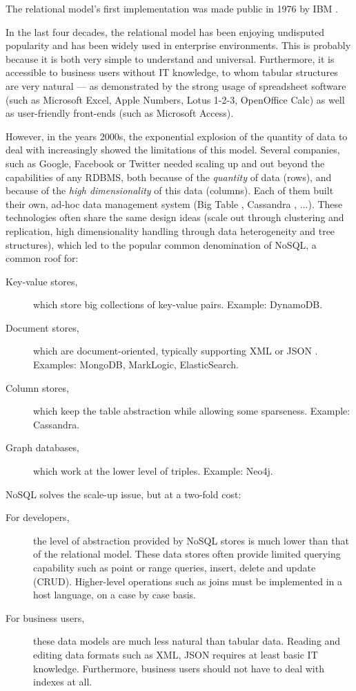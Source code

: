 \documentclass{acm_proc_article-sp}
\begin{document}
The relational model's first implementation was made public in 1976 by IBM \cite{Astrahan1976}.

In the last four decades, the relational model has been enjoying undisputed popularity and has been widely used in enterprise environments. This is probably because it is both very simple to understand and universal. Furthermore, it is accessible to business users without IT knowledge, to whom tabular structures are very natural --- as demonstrated by the strong usage of spreadsheet software \cite{Mattessich1958} \cite{Mattessich1961} (such as Microsoft Excel, Apple Numbers, Lotus 1-2-3, OpenOffice Calc) as well as user-friendly front-ends (such as Microsoft Access).

However, in the years 2000s, the exponential explosion of the quantity of data to deal with increasingly showed the limitations of this model. Several companies, such as Google, Facebook or Twitter needed scaling up and out beyond the capabilities of any RDBMS, both because of the \emph{quantity} of data (rows), and because of the \emph{high dimensionality} of this data (columns). Each of them built their own, ad-hoc data management system (Big Table \cite{Chang2008}, Cassandra \cite{Lakshman2010}, ...). These technologies often share the same design ideas (scale out through clustering and replication, high dimensionality handling through data heterogeneity and tree structures), which led to the popular common denomination of NoSQL, a common roof for:
\begin{description}
\item[Key-value stores,] which store big collections of key-value pairs. Example: DynamoDB.
\item[Document stores,] which are document-oriented, typically supporting XML \cite{XML} or JSON \cite{JSON}. Examples: MongoDB, MarkLogic, ElasticSearch.
\item[Column stores,] which keep the table abstraction while allowing some sparseness. Example: Cassandra.
\item[Graph databases,] which work at the lower level of triples. Example: Neo4j.
\end{description}

NoSQL solves the scale-up issue, but at a two-fold cost:
\begin{description}
\item[For developers,] the level of abstraction provided by NoSQL stores is much lower than that of the relational model. These data stores often provide limited querying capability such as point or range queries, insert, delete and update (CRUD). Higher-level operations such as joins must be implemented in a host language, on a case by case basis.
\item[For business users,] these data models are much less natural than tabular data. Reading and editing data formats such as XML, JSON requires at least basic IT knowledge. Furthermore, business users should not have to deal with indexes at all.
\end{description}
\end{document}
